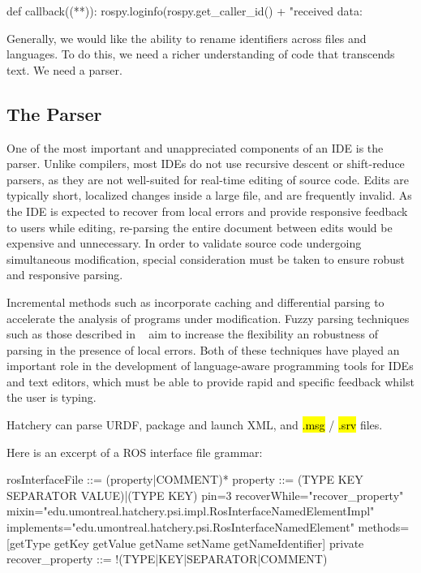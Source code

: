 \documentclass[12pt,initial,twoside,maitrise]{dms}
\newcommand{\inline}[1]{%
\begingroup%
\sethlcolor{slightgray}%
\hl{\ttfamily\small #1}%
\endgroup
}
\numberwithin{equation}{section}
\numberwithin{table}{chapter}
\numberwithin{figure}{chapter}
\begin{document}
\begin{pythonlisting}
def callback((**)):
    rospy.loginfo(rospy.get_caller_id() + "received data: %
\end{pythonlisting}
%
Generally, we would like the ability to rename identifiers across files and languages. To do this, we need a richer understanding of code that transcends text. We need a parser.

\subsection{The Parser}\label{subsec:the-parser}

One of the most important and unappreciated components of an IDE is the parser. Unlike compilers, most IDEs do not use recursive descent or shift-reduce parsers, as they are not well-suited for real-time editing of source code. Edits are typically short, localized changes inside a large file, and are frequently invalid. As the IDE is expected to recover from local errors and provide responsive feedback to users while editing, re-parsing the entire document between edits would be expensive and unnecessary. In order to validate source code undergoing simultaneous modification, special consideration must be taken to ensure robust and responsive parsing.

Incremental methods such as \citet{wagner1997practical,wagner1997incremental} incorporate caching and differential parsing to accelerate the analysis of programs under modification. Fuzzy parsing techniques such as those described in ~\citet{koppler1997systematic} aim to increase the flexibility an robustness of parsing in the presence of local errors. Both of these techniques have played an important role in the development of language-aware programming tools for IDEs and text editors, which must be able to provide rapid and specific feedback whilst the user is typing.

Hatchery can parse URDF, package and launch XML, and \inline{.msg}/\inline{.srv} files.

Here is an excerpt of a ROS interface file grammar:

\begin{bnflisting}
rosInterfaceFile ::= (property|COMMENT)*
property ::= (TYPE KEY SEPARATOR VALUE)|(TYPE KEY) {
    pin=3
    recoverWhile="recover_property"
    mixin="edu.umontreal.hatchery.psi.impl.RosInterfaceNamedElementImpl"
    implements="edu.umontreal.hatchery.psi.RosInterfaceNamedElement"
    methods=[getType getKey getValue getName setName getNameIdentifier]
}
private recover_property ::= !(TYPE|KEY|SEPARATOR|COMMENT)
\end{bnflisting}
%
\end{document}
